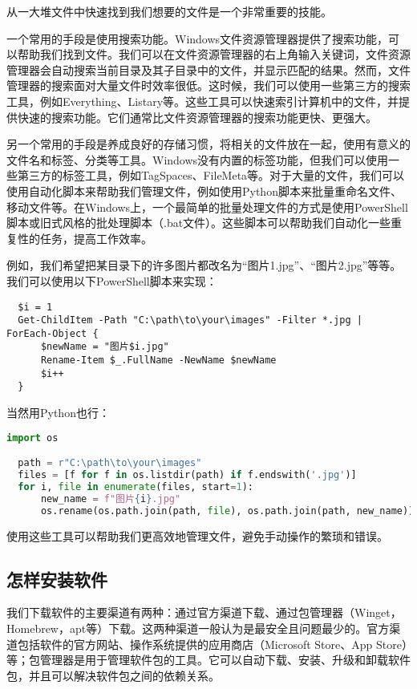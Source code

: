 从一大堆文件中快速找到我们想要的文件是一个非常重要的技能。

一个常用的手段是使用搜索功能。Windows文件资源管理器提供了搜索功能，可以帮助我们找到文件。我们可以在文件资源管理器的右上角输入关键词，文件资源管理器会自动搜索当前目录及其子目录中的文件，并显示匹配的结果。然而，文件管理器的搜索面对大量文件时效率很低。这时候，我们可以使用一些第三方的搜索工具，例如Everything、Listary等。这些工具可以快速索引计算机中的文件，并提供快速的搜索功能。它们通常比文件资源管理器的搜索功能更快、更强大。

另一个常用的手段是养成良好的存储习惯，将相关的文件放在一起，使用有意义的文件名和标签、分类等工具。Windows没有内置的标签功能，但我们可以使用一些第三方的标签工具，例如TagSpaces、FileMeta等。对于大量的文件，我们可以使用自动化脚本来帮助我们管理文件，例如使用Python脚本来批量重命名文件、移动文件等。在Windows上，一个最简单的批量处理文件的方式是使用PowerShell脚本或旧式风格的批处理脚本（.bat文件）。这些脚本可以帮助我们自动化一些重复性的任务，提高工作效率。

例如，我们希望把某目录下的许多图片都改名为“图片1.jpg”、“图片2.jpg”等等。我们可以使用以下PowerShell脚本来实现：
\begin{lstlisting}
  $i = 1
  Get-ChildItem -Path "C:\path\to\your\images" -Filter *.jpg | ForEach-Object {
      $newName = "图片$i.jpg"
      Rename-Item $_.FullName -NewName $newName
      $i++
  }
\end{lstlisting}
当然用Python也行：
\begin{lstlisting}[language=python]
  import os

  path = r"C:\path\to\your\images"
  files = [f for f in os.listdir(path) if f.endswith('.jpg')]
  for i, file in enumerate(files, start=1):
      new_name = f"图片{i}.jpg"
      os.rename(os.path.join(path, file), os.path.join(path, new_name))
\end{lstlisting}
使用这些工具可以帮助我们更高效地管理文件，避免手动操作的繁琐和错误。

\subsection{怎样安装软件}

我们下载软件的主要渠道有两种：通过官方渠道下载、通过包管理器（Winget，Homebrew，apt等）下载。这两种渠道一般认为是最安全且问题最少的。官方渠道包括软件的官方网站、操作系统提供的应用商店（Microsoft Store、App Store）等；包管理器是用于管理软件包的工具。它可以自动下载、安装、升级和卸载软件包，并且可以解决软件包之间的依赖关系。

